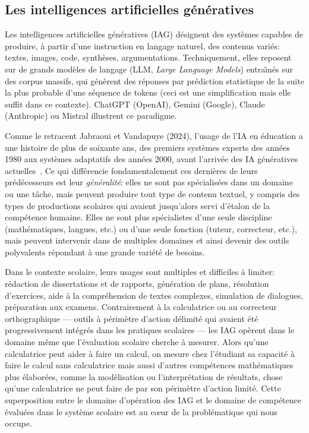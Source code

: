 \subsection{Les intelligences artificielles g\'en\'eratives}

Les intelligences artificielles g\'en\'eratives (IAG) d\'esignent des syst\`emes capables de produire, \`a partir d'une instruction en langage naturel, des contenus vari\'es: textes, images, code, synth\`eses, argumentations. 
Techniquement, elles reposent sur de grands mod\`eles de langage (LLM, \emph{Large Language Models}) entra\^\i n\'es sur des corpus massifs, qui g\'en\`erent des r\'eponses par pr\'ediction statistique de la suite la plus probable d'une s\'equence de tokens (ceci est une simplification mais elle suffit dans ce contexte). 
ChatGPT (OpenAI), Gemini (Google), Claude (Anthropic) ou Mistral illustrent ce paradigme.

Comme le retracent Jabraoui et Vandapuye (2024), l'usage de l'IA en \'education a une histoire de plus de soixante ans, des premiers syst\`emes experts des ann\'ees 1980 aux syst\`emes adaptatifs des ann\'ees 2000, avant l'arriv\'ee des IA g\'en\'eratives actuelles~\citep{siham2024intelligence}.
Ce qui diff\'erencie fondamentalement ces derni\`eres de leurs pr\'ed\'ecesseurs est leur \emph{g\'en\'eralit\'e}: elles ne sont pas sp\'ecialis\'ees dans un domaine ou une t\^ache, mais peuvent produire tout type de contenu textuel, y compris des types de productions scolaires qui avaient jusqu'alors servi d'\'etalon de la comp\'etence humaine.
Elles ne sont plus spécialistes d'une seule discipline (math\'ematiques, langues, etc.) ou d'une seule fonction (tuteur, correcteur, etc.), mais peuvent intervenir dans de multiples domaines et ainsi devenir des outils polyvalents répondant à une grande variété de besoins.

Dans le contexte scolaire, leurs usages sont multiples et difficiles \`a limiter: r\'edaction de dissertations et de rapports, g\'en\'eration de plans, r\'esolution d'exercices, aide \`a la compr\'ehension de textes complexes, simulation de dialogues, pr\'eparation aux examens. 
Contrairement \`a la calculatrice ou au correcteur orthographique --- outils \`a p\'erim\`etre d'action d\'elimit\'e qui avaient \'et\'e progressivement int\'egr\'es dans les pratiques scolaires --- les IAG op\`erent dans le domaine m\^eme que l'\'evaluation scolaire cherche \`a mesurer. 
Alors qu'une calculatrice peut aider \`a faire un calcul, on mesure chez l'\'etudiant sa capacit\'e \`a faire le calcul sans calculatrice mais aussi d'autres compétences math\'ematiques plus \'elabor\'ees, comme la mod\'elisation ou l'interpr\'etation de r\'esultats, chose qu'une calculatrice ne peut faire de par son p\'erim\`etre d'action limit\'e.
Cette superposition entre le domaine d'opération des IAG et le domaine de compétence évaluées dans le système scolaire est au c\oe{}ur de la probl\'ematique qui nous occupe.
